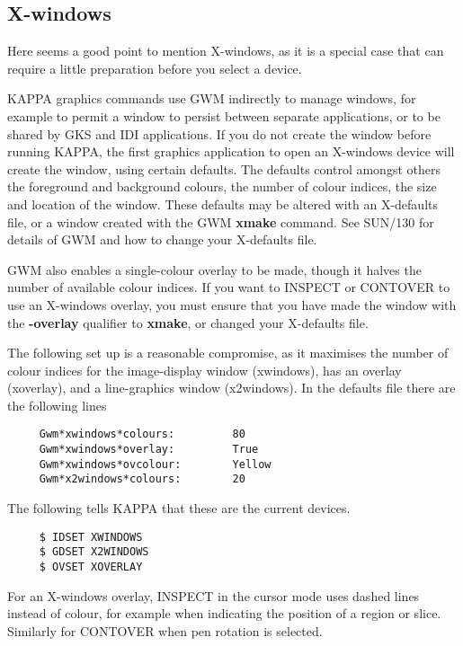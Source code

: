 \subsection{X-windows}
Here seems a good point to mention X-windows, as it is a special case
that can require a little preparation before you select a device.

{\small KAPPA} graphics commands use {\small GWM} indirectly to manage
windows, for example to permit a window to persist between separate
applications, or to be shared by GKS and IDI applications. If you do not
create the window before running {\small KAPPA}, the first graphics
application to open an X-windows device will create the window, using
certain defaults.  The defaults control amongst others the foreground
and background colours, the number of colour indices, the size and
location of the window. These defaults may be altered with an X-defaults
file, or a window created with the {\small GWM} {\bf xmake} command. See
SUN/130 for details of {\small GWM} and how to change your X-defaults
file. 

{\small GWM} also enables a single-colour overlay to be made, though
it halves the number of available colour indices.  If you want to
INSPECT or CONTOVER to use an X-windows overlay, you must ensure
that you have made the window with the {\bf -overlay} qualifier to
{\bf xmake}, or changed your X-defaults file.

The following set up is a reasonable compromise, as it maximises
the number of colour indices for the image-display window (xwindows),
has an overlay (xoverlay), and a line-graphics window (x2windows).
In the defaults file there are the following lines

\small
\begin{verbatim}
     Gwm*xwindows*colours:         80
     Gwm*xwindows*overlay:         True
     Gwm*xwindows*ovcolour:        Yellow
     Gwm*x2windows*colours:        20
\end{verbatim}
\normalsize

The following tells {\small KAPPA} that these are the current devices.

\small
\begin{verbatim}
     $ IDSET XWINDOWS
     $ GDSET X2WINDOWS
     $ OVSET XOVERLAY
\end{verbatim}
\normalsize
\bigskip

For an X-windows overlay, INSPECT in the cursor mode uses dashed lines
instead of colour, for example when indicating the position of a region
or slice.  Similarly for CONTOVER when pen rotation is selected.

